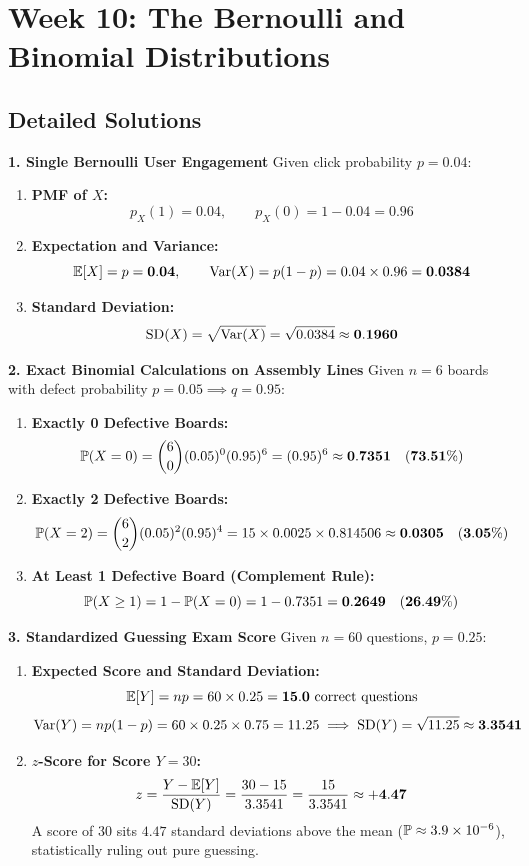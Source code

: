 \section*{Week 10: The Bernoulli and Binomial Distributions}

\subsection*{Detailed Solutions}

\textbf{1. Single Bernoulli User Engagement}
Given click probability $p = 0.04$:
\begin{enumerate}
    \item \textbf{PMF of $X$:}
    $$p_X(1) = 0.04, \qquad p_X(0) = 1 - 0.04 = \mathbf{0.96}$$
    \item \textbf{Expectation and Variance:}
    $$\E[X] = p = \mathbf{0.04}, \qquad \Var(X) = p(1 - p) = 0.04 \times 0.96 = \mathbf{0.0384}$$
    \item \textbf{Standard Deviation:}
    $$\SD(X) = \sqrt{\Var(X)} = \sqrt{0.0384} \approx \mathbf{0.1960}$$
\end{enumerate}

\textbf{2. Exact Binomial Calculations on Assembly Lines}
Given $n = 6$ boards with defect probability $p = 0.05 \implies q = 0.95$:
\begin{enumerate}
    \item \textbf{Exactly 0 Defective Boards:}
    $$\P(X = 0) = \binom{6}{0} (0.05)^0 (0.95)^6 = (0.95)^6 \approx \mathbf{0.7351 \quad (73.51\%)}$$
    \item \textbf{Exactly 2 Defective Boards:}
    $$\P(X = 2) = \binom{6}{2} (0.05)^2 (0.95)^4 = 15 \times 0.0025 \times 0.814506 \approx \mathbf{0.0305 \quad (3.05\%)}$$
    \item \textbf{At Least 1 Defective Board (Complement Rule):}
    $$\P(X \ge 1) = 1 - \P(X = 0) = 1 - 0.7351 = \mathbf{0.2649 \quad (26.49\%)}$$
\end{enumerate}

\textbf{3. Standardized Guessing Exam Score}
Given $n = 60$ questions, $p = 0.25$:
\begin{enumerate}
    \item \textbf{Expected Score and Standard Deviation:}
    $$\E[Y] = np = 60 \times 0.25 = \mathbf{15.0 \text{ correct questions}}$$
    $$\Var(Y) = np(1 - p) = 60 \times 0.25 \times 0.75 = 11.25 \implies \SD(Y) = \sqrt{11.25} \approx \mathbf{3.3541}$$
    \item \textbf{$z$-Score for Score $Y = 30$:}
    $$z = \frac{Y - \E[Y]}{\SD(Y)} = \frac{30 - 15}{3.3541} = \frac{15}{3.3541} \approx \mathbf{+4.47}$$
    A score of 30 sits $4.47$ standard deviations above the mean ($\P \approx 3.9 \times 10^{-6}$), statistically ruling out pure guessing.
\end{enumerate}

